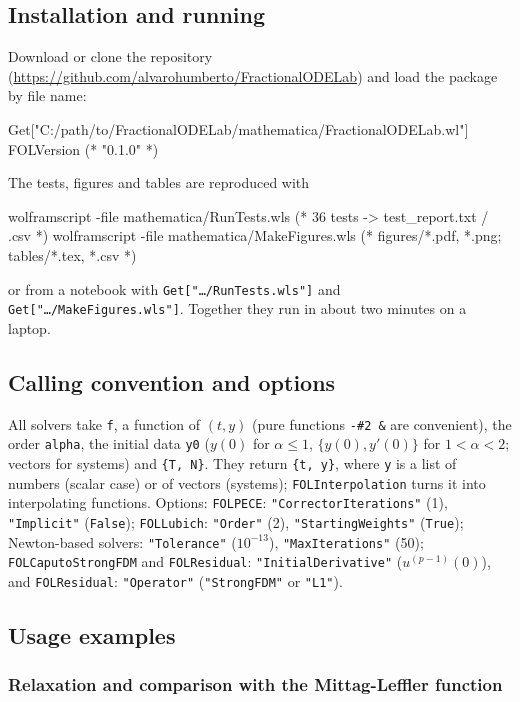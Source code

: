 \documentclass[11pt]{article}
\begin{document}
\subsection{Installation and running}
Download or clone the repository (\url{https://github.com/alvarohumberto/FractionalODELab}) and load the package by file name:
\begin{wlcode}
Get["C:/path/to/FractionalODELab/mathematica/FractionalODELab.wl"]
FOLVersion        (* "0.1.0" *)
\end{wlcode}
The tests, figures and tables are reproduced with
\begin{wlcode}
wolframscript -file mathematica/RunTests.wls       (* 36 tests -> test_report.txt / .csv *)
wolframscript -file mathematica/MakeFigures.wls    (* figures/*.pdf, *.png; tables/*.tex, *.csv *)
\end{wlcode}
or from a notebook with \texttt{Get["\dots/RunTests.wls"]} and \texttt{Get["\dots/MakeFigures.wls"]}. Together they run in about two minutes on a laptop.

\subsection{Calling convention and options}
All solvers take \texttt{f}, a function of $(t,y)$ (pure functions \texttt{-\#2 \&} are convenient), the order \texttt{alpha}, the initial data \texttt{y0} ($y(0)$ for $\alpha\le1$, $\{y(0),y'(0)\}$ for $1<\alpha<2$; vectors for systems) and \texttt{\{T, N\}}. They return \texttt{\{t, y\}}, where \texttt{y} is a list of numbers (scalar case) or of vectors (systems); \texttt{FOLInterpolation} turns it into interpolating functions. Options: \texttt{FOLPECE}: \texttt{"CorrectorIterations"} (1), \texttt{"Implicit"} (\texttt{False}); \texttt{FOLLubich}: \texttt{"Order"} (2), \texttt{"StartingWeights"} (\texttt{True}); Newton-based solvers: \texttt{"Tolerance"} ($10^{-13}$), \texttt{"MaxIterations"} (50); \texttt{FOLCaputoStrongFDM} and \texttt{FOLResidual}: \texttt{"InitialDerivative"} ($u^{(p-1)}(0)$), and \texttt{FOLResidual}: \texttt{"Operator"} (\texttt{"StrongFDM"} or \texttt{"L1"}).

\subsection{Usage examples}
\subsubsection*{Relaxation and comparison with the Mittag-Leffler function}
\end{document}
